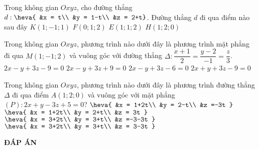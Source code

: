 \begin{ex}%
	Trong không gian $Oxyz$, cho đường thẳng $d:\heva{
		&x = t\\
		&y = 1-t\\
		&z = 2+t}$.  Đường thẳng $d$ đi qua điểm nào sau đây
	\choice
	{$K\left(1;-1;1\right)$}
	{\True $F\left(0;1;2\right)$}
	{$E\left(1;1;2\right)$}
	{$H\left(1;2;0\right)$}
\end{ex}


\begin{ex}%
	Trong không gian $Oxyz$, phương trình nào dưới đây là phương trình mặt phẳng đi qua $M\left(1;-1;2\right)$ và vuông góc với đường thẳng $\Delta:\dfrac{x+1}{2} = \dfrac{y-2}{-1} = \dfrac{z}{3}$.
	\choice
	{\True $2x-y+3z-9 = 0$}
	{$2x-y+3z+9 = 0$}
	{$2x-y+3z-6 = 0$}
	{$2x+y+3z-9 = 0$}
\end{ex}


\begin{ex}%
	Trong không gian $Oxyz$, phương trình nào dưới đây là phương trình đường thẳng $\Delta $ đi qua điểm $A\left(1;2;0\right)$ và vuông góc với mặt phẳng $(P)\colon2x+y-3z+5 = 0$?
	\choice
	{$\heva{
			&x = 1+2t\\
			&y = 2-t\\
			&z =-3t
		}$}
	{$\heva{
			&x = 1+2t\\
			&y = 2+t\\
			&z = 3t
		}$}
	{\True $  \heva{
			&x = 3+2t\\
			&y = 3+t\\
			&z =-3-3t
		}$}
	{$  \heva{
			&x = 3+2t\\
			&y = 3+t\\
			&z = 3-3t
		}$}
\end{ex}

\newpage
\begin{center}
	\textbf{ĐÁP ÁN}
\end{center}
\begin{multicols}{10}
	 
\end{multicols}